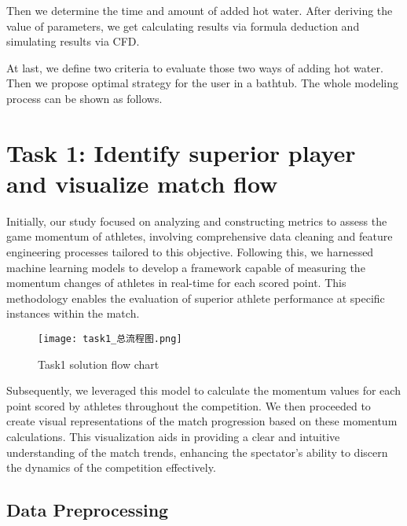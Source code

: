 \documentclass{mcmthesis}
\begin{document}
Then we determine the time and amount of added hot water. After deriving the value of parameters, we get calculating results via formula deduction and simulating results via CFD.

At last, we define two criteria to evaluate those two ways of adding hot water. Then we propose optimal strategy for the user in a bathtub.
The whole modeling process can be shown as follows.

\section{Task 1: Identify superior player and visualize match flow}
Initially, our study focused on analyzing and constructing metrics to assess the game momentum of athletes, involving comprehensive data cleaning and feature engineering processes tailored to this objective. Following this, we harnessed machine learning models to develop a framework capable of measuring the momentum changes of athletes in real-time for each scored point. This methodology enables the evaluation of superior athlete performance at specific instances within the match.

\begin{figure}[h]
    \centering
    \texttt{[image: task1\_总流程图.png]}
    \caption{Task1 solution flow chart} \label{fig1}
\end{figure}

Subsequently, we leveraged this model to calculate the momentum values for each point scored by athletes throughout the competition. We then proceeded to create visual representations of the match progression based on these momentum calculations. This visualization aids in providing a clear and intuitive understanding of the match trends, enhancing the spectator's ability to discern the dynamics of the competition effectively.
\subsection{Data Preprocessing}
\end{document}
